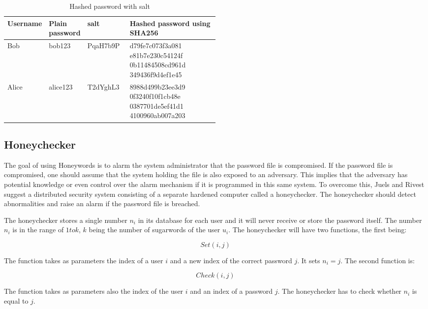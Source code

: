 \documentclass[../main.tex]{subfiles}
\begin{document}
\begin{table}
  \centering
	\begin{tabularx}{0.5\textwidth}{|m{0.15\linewidth}|m{0.15\linewidth}|m{0.2\linewidth}
		|X|}
    \hline
		\textbf{Username} & \textbf{Plain password} & \textbf{salt} &
    \textbf{Hashed password using SHA256} \\ 
    \hline
    Bob & bob123     & PqaH7b9P & d79fe7c073f3a081
			          e81b7e230c54124f
			          0b11484508cd961d
			          349436f9d4ef1e45\\
    \hline
    Alice & alice123 & T2dYghL3 & 8988d499b23ee3d9
		                  0f3240f10f1cb48e
				  0387701de5ef41d1
				  4100960ab007a203\\
    \hline
  \end{tabularx}
  \caption{Hashed password with salt}
  \label{table:2}
\end{table}


\subsection{Honeychecker}
The goal of using Honeywords is to alarm the system administrator that the
password file is compromised. If the password file is compromised, one should
assume that the system holding the file is also exposed to an adversary. This
implies that the adversary has potential knowledge or even control over the
alarm mechanism if it is programmed in this same system. To overcome this,
Juels and Rivest suggest a distributed security system consisting of a separate
hardened computer called a honeychecker. The honeychecker should detect
abnormalities and raise an alarm if the password file is breached.

The honeychecker stores a single number \(n_i\) in its database for each user
and it will never receive or store the password itself. The number \(n_i\) is
in the range of \(1 to k\), \(k\) being the number of sugarwords of the user
\(u_i\). The honeychecker will have two functions, the first being:

\[Set(i,j)\]

The function takes as parameters the index of a user \(i\) and a new index of
the correct password \(j\). It sets \(n_i = j\). The second function is:

\[Check(i,j)\]

The function takes as parameters also the index of the user \(i\) and an index
of a password \(j\). The honeychecker has to check whether \(n_i\) is equal to
\(j\).
\end{document}
